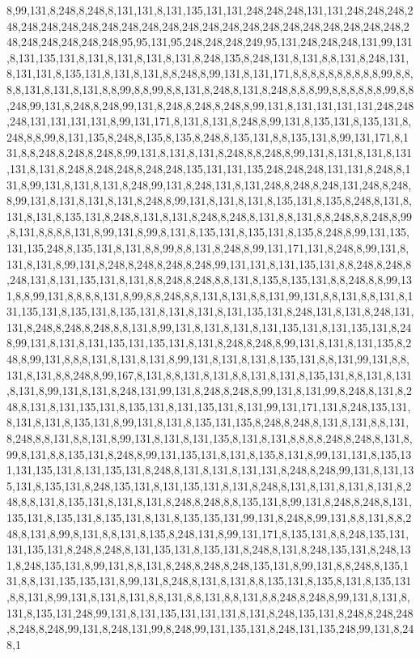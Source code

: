 8,99,131,8,248,8,248,8,131,131,8,131,135,131,131,248,248,248,131,131,248,248,248,248,248,248,248,248,248,248,248,248,248,248,248,248,248,248,248,248,248,248,248,248,248,248,248,248,248,95,95,131,95,248,248,248,249,95,131,248,248,248,131,99,131,8,131,135,131,8,131,8,131,8,131,8,131,8,248,135,8,248,131,8,131,8,8,131,8,248,131,8,131,131,8,135,131,8,131,8,131,8,8,248,8,99,131,8,131,171,8,8,8,8,8,8,8,8,8,8,99,8,8,8,8,131,8,131,8,131,8,8,99,8,8,99,8,8,131,8,248,8,131,8,248,8,8,8,99,8,8,8,8,8,8,99,8,8,248,99,131,8,248,8,248,99,131,8,248,8,248,8,248,8,99,131,8,131,131,131,131,248,248,248,131,131,131,131,8,99,131,171,8,131,8,131,8,248,8,99,131,8,135,131,8,135,131,8,248,8,8,99,8,131,135,8,248,8,135,8,135,8,248,8,135,131,8,8,135,131,8,99,131,171,8,131,8,8,248,8,248,8,248,8,99,131,8,131,8,131,8,248,8,8,248,8,99,131,8,131,8,131,8,131,131,8,131,8,248,8,248,248,8,248,248,135,131,131,135,248,248,248,131,131,8,248,8,131,8,99,131,8,131,8,131,8,248,99,131,8,248,131,8,131,248,8,248,8,248,131,248,8,248,8,99,131,8,131,8,131,8,131,8,248,8,99,131,8,131,8,131,8,135,131,8,135,8,248,8,131,8,131,8,131,8,135,131,8,248,8,131,8,131,8,248,8,248,8,131,8,8,131,8,8,248,8,8,248,8,99,8,131,8,8,8,8,131,8,99,131,8,99,8,131,8,135,131,8,135,131,8,135,8,248,8,99,131,135,131,135,248,8,135,131,8,131,8,8,99,8,8,131,8,248,8,99,131,171,131,8,248,8,99,131,8,131,8,131,8,99,131,8,248,8,248,8,248,8,248,99,131,131,8,131,135,131,8,8,248,8,248,8,248,131,8,131,135,131,8,131,8,8,248,8,248,8,8,131,8,135,8,135,131,8,8,248,8,8,99,131,8,8,99,131,8,8,8,8,131,8,99,8,8,248,8,8,131,8,131,8,8,131,99,131,8,8,131,8,8,131,8,131,135,131,8,135,131,8,135,131,8,131,8,131,8,131,135,131,8,248,131,8,131,8,248,131,131,8,248,8,248,8,248,8,8,131,8,99,131,8,131,8,131,8,131,135,131,8,131,135,131,8,248,99,131,8,131,8,131,135,131,135,131,8,131,8,248,8,248,8,99,131,8,131,8,131,135,8,248,8,99,131,8,8,8,131,8,131,8,131,8,99,131,8,131,8,131,8,135,131,8,8,131,99,131,8,8,131,8,131,8,8,248,8,99,167,8,131,8,8,131,8,131,8,8,131,8,131,8,135,131,8,8,131,8,131,8,131,8,99,131,8,131,8,248,131,99,131,8,248,8,248,8,99,131,8,131,99,8,248,8,131,8,248,8,131,8,131,135,131,8,135,131,8,131,135,131,8,131,99,131,171,131,8,248,135,131,8,131,8,131,8,135,131,8,99,131,8,131,8,135,131,135,8,248,8,248,8,131,8,131,8,8,131,8,248,8,8,131,8,8,131,8,99,131,8,131,8,131,135,8,131,8,131,8,8,8,8,248,8,248,8,131,8,99,8,131,8,8,135,131,8,248,8,99,131,135,131,8,131,8,135,8,131,8,99,131,131,8,135,131,131,135,131,8,131,135,131,8,248,8,131,8,131,8,131,131,8,248,8,248,99,131,8,131,135,131,8,135,131,8,248,135,131,8,131,135,131,8,131,8,248,8,131,8,131,8,131,8,131,8,248,8,8,131,8,135,131,8,131,8,131,8,248,8,248,8,8,135,131,8,99,131,8,248,8,248,8,131,135,131,8,135,131,8,135,131,8,131,8,135,135,131,99,131,8,248,8,99,131,8,8,131,8,8,248,8,131,8,99,8,131,8,8,131,8,135,8,248,131,8,99,131,171,8,135,131,8,8,248,135,131,131,135,131,8,248,8,248,8,131,135,131,8,135,131,8,248,8,131,8,248,135,131,8,248,131,8,248,135,131,8,99,131,8,8,131,8,248,8,248,8,248,135,131,8,99,131,8,8,248,8,135,131,8,8,131,135,135,131,8,99,131,8,248,8,131,8,131,8,8,135,131,8,135,8,131,8,135,131,8,8,131,8,99,131,8,131,8,131,8,8,131,8,8,131,8,8,131,8,8,248,8,248,8,99,131,8,131,8,131,8,135,131,248,99,131,8,131,135,131,131,131,8,131,8,248,135,131,8,248,8,248,248,8,248,8,248,99,131,8,248,131,99,8,248,99,131,135,131,8,248,131,135,248,99,131,8,248,1